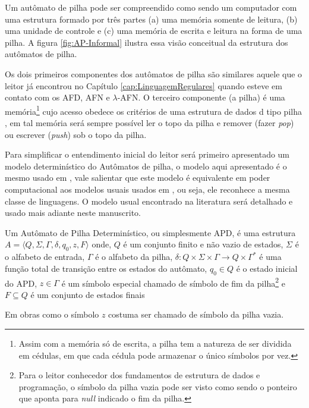 Um autômato de pilha pode ser compreendido como sendo um computador com uma estrutura formado por três partes (a) uma memória somente de leitura, (b) uma unidade de controle e (c) uma memória de escrita e leitura na forma de uma pilha. A figura \ref{fig:AP-Informal} ilustra essa visão conceitual da estrutura dos autômatos de pilha.

Os dois primeiros componentes dos autômatos de pilha são similares aquele que o leitor já encontrou no Capítulo \ref{cap:LinguagemRegulares} quando esteve em contato com os AFD, AFN e $\lambda$-AFN. O terceiro componente (a pilha) é uma memória\footnote{Assim com a memória só de escrita, a pilha tem a natureza de ser dividida em cédulas, em que cada cédula pode armazenar o único símbolos por vez.} cujo acesso obedece os critérios de uma estrutura de dados d tipo pilha \cite{jaime1994}, em tal memória será sempre possível ler o topo da pilha e remover (fazer \textit{pop}) ou escrever (\textit{push}) sob o topo da pilha.

Para simplificar o entendimento inicial do leitor será primeiro apresentado um modelo determinístico do Autômatos de pilha, o modelo aqui apresentado é o mesmo usado em \cite{benjaLivro2010}, vale salientar que este modelo é equivalente em poder computacional aos modelos usuais usados em \cite{harrison1978, hopcroft2008}, ou seja, ele reconhece a mesma classe de linguagens. O modelo usual encontrado na literatura será detalhado e usado mais adiante neste manuscrito.

\begin{definition}\label{def:APD}
    Um Autômato de Pilha Determinístico, ou simplesmente APD, é uma estrutura $A = \langle Q, \Sigma, \Gamma, \delta, q_0, z, F\rangle$ onde, $Q$ é um conjunto finito e não vazio de estados, $\Sigma$ é o alfabeto de entrada, $\Gamma$ é o alfabeto da pilha, $\delta: Q \times \Sigma \times \Gamma  \rightarrow Q \times \Gamma^*$ é uma função total de transição entre os estados do autômato, $q_0 \in Q$ é o estado inicial do APD, $z \in \Gamma$ é um símbolo especial chamado de símbolo de fim da pilha\footnote{Para o leitor conhecedor dos fundamentos de estrutura de dados e programação, o símbolo da pilha vazia pode ser visto como sendo o ponteiro que aponta para \textit{null} indicado o fim da pilha.} e  $F \subseteq Q$ é um conjunto de estados finais
\end{definition}

\begin{remark}
    Em obras como \cite{benjaLivro2010, harrison1978, hopcroft2008, menezes1998LFA} o símbolo $z$ costuma ser chamado de símbolo da pilha vazia.
\end{remark}

